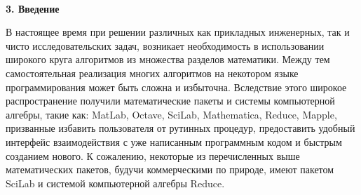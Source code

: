 \documentclass[russian,utf8,nocolumnxxxi,nocolumnxxxii]{eskdtext}
\begin{document}
\begin{figure}[H]
\begin{center}
\begin{minipage}[h]{0.65\linewidth}
  \\
\end{minipage}
\end{center}
\end{figure}


\newpage

{\bf3. Введение}

В настоящее время при решении различных как прикладных инженерных, так и чисто исследовательских задач, возникает необходимость в использовании широкого круга алгоритмов из множества разделов математики. Между тем самостоятельная реализация многих алгоритмов на некотором языке программирования может быть сложна и избыточна. Вследствие этого широкое распространение получили математические пакеты и системы компьютерной алгебры, такие как: MatLab, Octave, SciLab, Mathematica, Reduce, Mapple, призванные избавить пользователя от рутинных процедур, предоставить удобный интерфейс взаимодействия с уже написанным программным кодом и быстрым созданием нового. К сожалению, некоторые из перечисленных выше математических пакетов, будучи коммерческими по природе, имеют пакетом SciLab и системой компьютерной алгебры Reduce.
\end{document}
